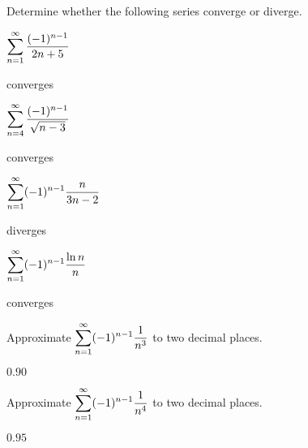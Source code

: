 \begin{exercises}

Determine whether the following series converge or diverge.

\twocol

\begin{exercise} $\displaystyle\sum_{n=1}^\infty {(-1)^{n-1}\over 2n+5}$
\begin{answer} converges
\end{answer}\end{exercise}

\begin{exercise} $\displaystyle\sum_{n=4}^\infty {(-1)^{n-1}\over \sqrt{n-3}}$
\begin{answer} converges
\end{answer}\end{exercise}

\begin{exercise} $\displaystyle\sum_{n=1}^\infty (-1)^{n-1}{n\over 3n-2}$
\begin{answer} diverges
\end{answer}\end{exercise}

\begin{exercise} $\displaystyle\sum_{n=1}^\infty (-1)^{n-1}{\ln n\over n}$
\begin{answer} converges
\end{answer}\end{exercise}
\endtwocol

\msk

\begin{exercise} Approximate $\displaystyle\sum_{n=1}^\infty (-1)^{n-1}{1\over n^3}$ to
two decimal places.
\begin{answer} $0.90$
\end{answer}\end{exercise}

\begin{exercise} Approximate $\displaystyle\sum_{n=1}^\infty (-1)^{n-1}{1\over n^4}$ to
two decimal places. 
\begin{answer} $0.95$
\end{answer}\end{exercise}

\end{exercises}

